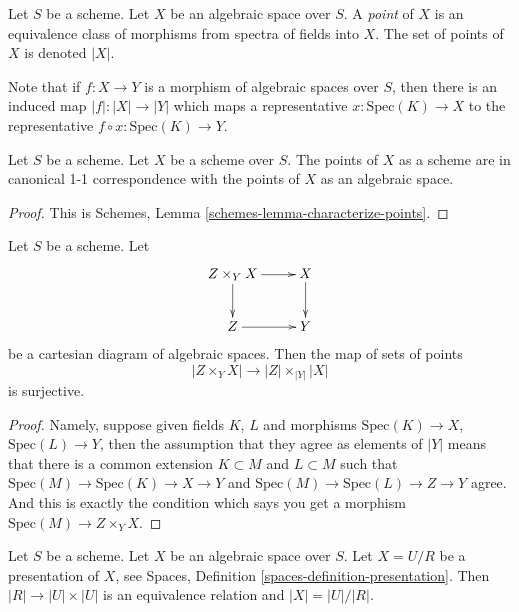 \begin{definition}
\label{definition-points}
Let $S$ be a scheme. Let $X$ be an algebraic space over $S$.
A {\it point} of $X$ is an equivalence class of morphisms
from spectra of fields into $X$.
The set of points of $X$ is denoted $|X|$.
\end{definition}

\noindent
Note that if $f : X \to Y$ is a morphism of algebraic spaces
over $S$, then there is an induced map $|f| : |X| \to |Y|$ which
maps a representative $x : \text{Spec}(K) \to X$ to the representative
$f \circ x : \text{Spec}(K) \to Y$.

\begin{lemma}
\label{lemma-scheme-points}
Let $S$ be a scheme. Let $X$ be a scheme over $S$.
The points of $X$ as a scheme are in canonical 1-1 correspondence
with the points of $X$ as an algebraic space.
\end{lemma}

\begin{proof}
This is Schemes, Lemma \ref{schemes-lemma-characterize-points}.
\end{proof}

\begin{lemma}
\label{lemma-points-cartesian}
Let $S$ be a scheme. Let
$$
\xymatrix{
Z \times_Y X \ar[r] \ar[d] & X \ar[d] \\
Z \ar[r] & Y
}
$$
be a cartesian diagram of algebraic spaces. Then the map of sets
of points
$$
|Z \times_Y X|
\longrightarrow
|Z| \times_{|Y|} |X|
$$
is surjective.
\end{lemma}

\begin{proof}
Namely, suppose given fields $K$, $L$ and morphisms
$\text{Spec}(K) \to X$, $\text{Spec}(L) \to Y$, then the
assumption that they agree as elements of $|Y|$ means that
there is a common extension $K \subset M$ and $L \subset M$
such that
$\text{Spec}(M) \to \text{Spec}(K) \to X \to Y$ and
$\text{Spec}(M) \to \text{Spec}(L) \to Z \to Y$ agree.
And this is exactly the condition which says you get a
morphism $\text{Spec}(M) \to Z \times_Y X$.
\end{proof}

\begin{lemma}
\label{lemma-points-presentation}
Let $S$ be a scheme.
Let $X$ be an algebraic space over $S$.
Let $X = U/R$ be a presentation of $X$, see
Spaces, Definition \ref{spaces-definition-presentation}.
Then $|R| \to |U| \times |U|$ is an equivalence relation
and $|X| = |U|/|R|$.
\end{lemma}

